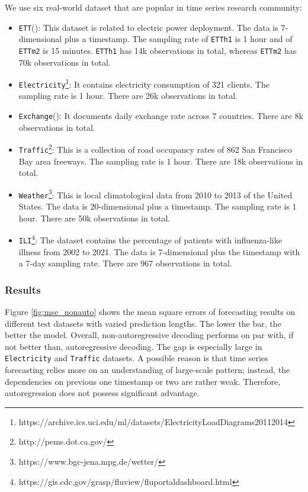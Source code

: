 We use six real-world dataset that are popular in time series research community: \begin{itemize}
    \item \texttt{ETT}(\citet{https://doi.org/10.48550/arxiv.2012.07436}): This dataset is related to electric power deployment. The data is 7-dimensional plus a timestamp. 
    The sampling rate of \texttt{ETTh1} is 1 hour and of \texttt{ETTm2} is 15 minutes. 
    \texttt{ETTh1} has 14k observations in total, whereas \texttt{ETTm2} has 70k observations in total. 
    \item \texttt{Electricity}\footnote{https://archive.ics.uci.edu/ml/datasets/ElectricityLoadDiagrams20112014}: It contains electricity consumption of 321 clients. The sampling rate is 1 hour. There are 26k observations in total. 
    \item \texttt{Exchange}(\citet{https://doi.org/10.48550/arxiv.1703.07015}): It documents daily exchange rate across 7 countries. There are 8k observations in total. 
    \item \texttt{Traffic}\footnote{http://pems.dot.ca.gov/}: This is a collection of road occupancy rates of 862 San Francisco Bay area freeways. The sampling rate is 1 hour. There are 18k observations in total. 
    \item \texttt{Weather}\footnote{https://www.bgc-jena.mpg.de/wetter/}: This is local climatological data from 2010 to 2013 of the United States. The data is 20-dimensional plus a timestamp. 
    The sampling rate is 1 hour. There are 50k observations in total. 
    \item \texttt{ILI}\footnote{https://gis.cdc.gov/grasp/fluview/fluportaldashboard.html}: The dataset contains the percentage of patients with influenza-like illness from 2002 to 2021. 
    The data is 7-dimensional plus the timestamp with a 7-day sampling rate. There are 967 observations in total. 
\end{itemize}

\subsubsection{Results}
Figure \ref{fig:mse_nonauto} shows the mean square errors of forecasting results on different test datasets with varied prediction lengths. 
The lower the bar, the better the model. 
Overall, non-autoregressive decoding performs on par with, if not better than, autoregressive decoding. 
The gap is especially large in \texttt{Electricity} and \texttt{Traffic} datasets. 
A possible reason is that time series forecasting relies more on an understanding of large-scale pattern; 
instead, the dependencies on previous one timestamp or two are rather weak. 
Therefore, autoregression does not possess significant advantage. 

